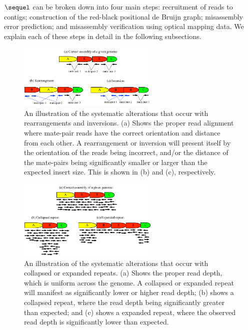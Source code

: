 \documentclass[doctor]{thesis}
\begin{document}
$\sequel$ can be broken down into four main steps: recruitment of reads to contigs; construction of the red-black positional de Bruijn graph; misassembly error prediction; and misassembly verification using optical mapping data.   
We explain each of these steps in detail in the following subsections. 


        \begin{figure}[h!]
            \centering
              	\includegraphics[width=0.6\textwidth]{recomb15mis/types_of_misassemblies_read_alignment.pdf}
                	\caption{An illustration of the systematic alterations that occur with rearrangements and inversions.  (a) Shows the proper read alignment where mate-pair reads have the correct orientation and distance from each other. A  rearrangement or	inversion will present itself by the orientation of the reads being incorrect, and/or the distance of the mate-pairs being significantly smaller or larger than the expected insert size. This is shown in (b) and (c), respectively.}
                	\label{fig:read_alignment_1}
        \end{figure}
             	\begin{figure}[h!]
		\centering
                	\includegraphics[width=0.6\textwidth]{recomb15mis/types_of_misassemblies_read_alignment_2.pdf}
       		\caption{An illustration of the systematic alterations that occur with collapsed or expanded repeats.  (a) Shows the proper read depth, which is uniform across the genome. A collapsed or expanded repeat will manifest as significantly lower or higher read depth; (b) shows a collapsed repeat, where the read depth being significantly greater than expected; and (c) shows a expanded repeat, where the observed read depth is significantly lower than expected.}
        		\label{fig:read_alignment_2}
        \end{figure}
\end{document}
